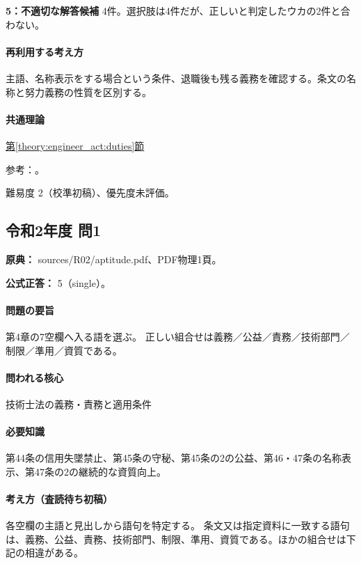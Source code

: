 \noindent\textbf{5：不適切な解答候補} 4件。選択肢は4件だが、正しいと判定したウカの2件と合わない。\par

\paragraph{再利用する考え方} 主語、名称表示をする場合という条件、退職後も残る義務を確認する。条文の名称と努力義務の性質を区別する。

\paragraph{共通理論} \hyperref[theory:engineer_act:duties]{第\ref*{theory:engineer_act:duties}節}

\par 参考：\cite{engineer_act_current}。

\par 難易度 2（校準初稿）、優先度未評価。

\subsection{令和2年度 問1}
\label{q:r02-reg-apt-01}

\noindent\textbf{原典：} sources/R02/aptitude.pdf、PDF物理1頁。

\textbf{公式正答：} 5（single）。

\paragraph{問題の要旨} 第4章の7空欄へ入る語を選ぶ。 正しい組合せは義務／公益／責務／技術部門／制限／準用／資質である。

\paragraph{問われる核心} 技術士法の義務・責務と適用条件

\paragraph{必要知識} 第44条の信用失墜禁止、第45条の守秘、第45条の2の公益、第46・47条の名称表示、第47条の2の継続的な資質向上。

\paragraph{考え方（査読待ち初稿）} 各空欄の主語と見出しから語句を特定する。 条文又は指定資料に一致する語句は、義務、公益、責務、技術部門、制限、準用、資質である。ほかの組合せは下記の相違がある。

